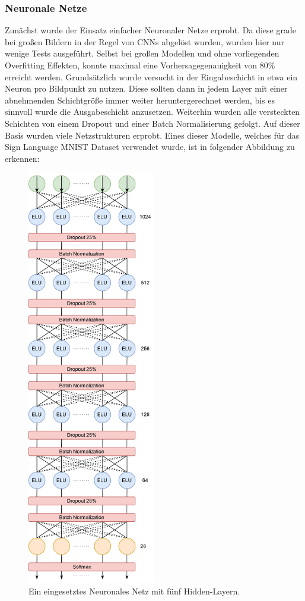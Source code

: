 \documentclass[11pt,bibliography=totocnumbered]{scrartcl}
\begin{document}
\subsubsection{Neuronale Netze}
Zunächst wurde der Einsatz einfacher Neuronaler Netze erprobt. Da diese grade bei großen Bildern in der Regel von CNNs abgelöst wurden, wurden hier nur wenige Tests ausgeführt. Selbst bei großen Modellen und ohne vorliegenden Overfitting Effekten, konnte maximal eine Vorhersagegenauigkeit von 80\% erreicht werden. Grundsätzlich wurde versucht in der Eingabeschicht in etwa ein Neuron pro Bildpunkt zu nutzen. Diese sollten dann in jedem Layer mit einer abnehmenden Schichtgröße immer weiter heruntergerechnet werden, bis es sinnvoll wurde die Ausgabeschicht anzusetzen. Weiterhin wurden alle versteckten Schichten von einem Dropout und einer Batch Normalisierung gefolgt. Auf dieser Basis wurden viele Netzstrukturen erprobt. Eines dieser Modelle, welches für das Sign Language MNIST Dataset verwendet wurde, ist in folgender Abbildung zu erkennen: 
\begin{figure}[H]
	\centering
	\includegraphics[width=0.50\textwidth]{nn_1}
	\vspace*{-3mm}
	\caption[Eingesetztes Neuronales Netz mit fünf Hidden-Layern]{Ein eingesetztes Neuronales Netz mit fünf Hidden-Layern.}
	\label{fig:nn_1}
\end{figure}
\end{document}
